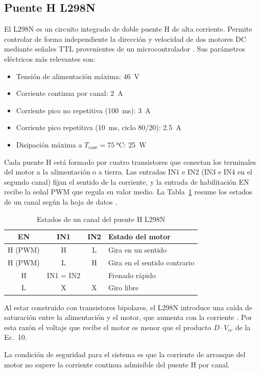 \documentclass[conference]{IEEEtran}
\begin{document}
\subsection{Puente H L298N}
El L298N es un circuito integrado de doble puente H de alta corriente. Permite controlar de forma independiente la dirección y velocidad de dos motores DC mediante señales TTL provenientes de un microcontrolador \cite{l298}. Sus parámetros eléctricos más relevantes son:
\begin{itemize}
\item Tensión de alimentación máxima: \SI{46}{V}
\item Corriente continua por canal: \SI{2}{A}
\item Corriente pico no repetitiva (\SI{100}{ms}): \SI{3}{A}
\item Corriente pico repetitiva (\SI{10}{ms}, ciclo 80/20): \SI{2.5}{A}
\item Disipación máxima a $T_{\text{case}} = \SI{75}{\celsius}$: \SI{25}{W}
\end{itemize}
Cada puente H está formado por cuatro transistores que conectan los terminales del motor a la alimentación o a tierra. Las entradas IN1 e IN2 (IN3 e IN4 en el segundo canal) fijan el sentido de la corriente, y la entrada de habilitación EN recibe la señal PWM que regula su valor medio. La Tabla~\ref{tab:puenteh} resume los estados de un canal según la hoja de datos \cite{l298}.

\begin{table}[!t]
\caption{Estados de un canal del puente H L298N \cite{l298}}
\label{tab:puenteh}
\centering
\begin{tabular}{@{}cccl@{}}
\toprule
EN & IN1 & IN2 & Estado del motor \\
\midrule
H (PWM) & H & L & Gira en un sentido \\
H (PWM) & L & H & Gira en el sentido contrario \\
H & IN1 = IN2 & & Frenado rápido \\
L & X & X & Giro libre \\
\bottomrule
\end{tabular}
\end{table}

Al estar construido con transistores bipolares, el L298N introduce una caída de saturación entre la alimentación y el motor, que aumenta con la corriente \cite{l298}. Por esta razón el voltaje que recibe el motor es menor que el producto $D \cdot V_{\text{cc}}$ de la Ec.~10.

La condición de seguridad para el sistema es que la corriente de arranque del motor no supere la corriente continua admisible del puente H por canal.
\end{document}
